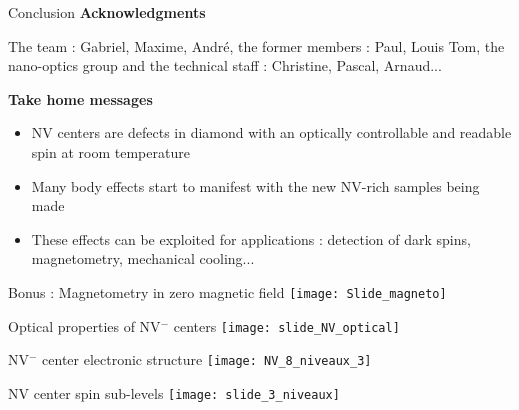 \documentclass{beamer}
\begin{document}
\begin{frame}{Conclusion}
\textbf{Acknowledgments}  

The team : Gabriel, Maxime, André, the former members : Paul, Louis Tom, the nano-optics group and the technical staff : Christine, Pascal, Arnaud...

\bigskip
\textbf{Take home messages }
\begin{itemize}
\item NV centers are defects in diamond with an optically controllable and readable spin at room temperature
\medskip
\item Many body effects start to manifest with the new NV-rich samples being made
\medskip
\item These effects can be exploited for applications : detection of dark spins, magnetometry, mechanical cooling...
\end{itemize}
\end{frame}
\begin{frame}{Bonus : Magnetometry in zero magnetic field}
\centering
\texttt{[image: Slide\_magneto]}
\end{frame}
\begin{frame}{Optical properties of NV$^-$ centers}
\centering
\texttt{[image: slide\_NV\_optical]}
\end{frame}
\begin{frame}{NV$^-$ center electronic structure}
\centering
\texttt{[image: NV\_8\_niveaux\_3]}
\end{frame}
\begin{frame}{NV center spin sub-levels}
\centering
\texttt{[image: slide\_3\_niveaux]}
\end{frame}
\end{document}
